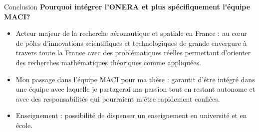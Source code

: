 \documentclass[compress,10pt,aspectratio=169]{beamer}
\begin{document}
\begin{frame}{Conclusion}
\small
{\bf Pourquoi intégrer l'ONERA et plus spécifiquement l'équipe MACI?}\\\vspace{0.5cm}
\begin{itemize}
\item {\color{onera} Acteur majeur de la recherche aéronautique et spatiale en France :} au cœur de pôles d’innovations scientifiques et technologiques de grande envergure à travers toute la France avec des problématiques réelles permettant d'orienter des recherches mathématiques théoriques comme appliquées.\\\vspace{0.5cm}
\item {\color{onera} Mon passage dans l'équipe MACI pour ma thèse :} garantit d'être intégré dans une équipe avec laquelle je partagerai ma passion tout en restant autonome et avec des responsabilités qui pourraient m'être rapidement confiées.\\\vspace{0.5cm}
\item {\color{onera} Enseignement :} possibilité de dispenser un enseignement en université et en école.
\end{itemize}
\end{frame}



\end{document}

